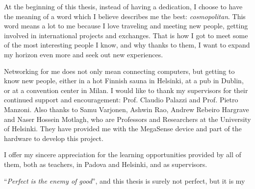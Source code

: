 
At the beginning of this thesis, instead of having a dedication, I choose to have the meaning of a word which I believe describes me the best: \textit{cosmopolitan}.
This word means a lot to me because I love traveling and meeting new people, getting involved in international projects and exchanges.
That is how I got to meet some of the most interesting people I know, and why thanks to them, I want to expand my horizon even more and seek out new experiences.

Networking for me does not only mean connecting computers, but getting to know new people, either in a hot Finnish sauna in Helsinki, at a pub in Dublin, or at a convention center in Milan.
\newline
\newline
\indent
I would like to thank my supervisors for their continued support and encouragement: Prof. Claudio Palazzi and Prof. Pietro Manzoni.
Also thanks to Samu Varjonen, Ashwin Rao, Andrew Rebeiro Hargrave and ‪Naser Hossein Motlagh‬, who are Professors and Researchers at the University of Helsinki.
They have provided me with the MegaSense device and part of the hardware to develop this project.

I offer my sincere appreciation for the learning opportunities provided by all of them, both as teachers, in Padova and Helsinki, and as supervisors.

``\textit{Perfect is the enemy of good}'',  and this thesis is surely not perfect, but it is my 